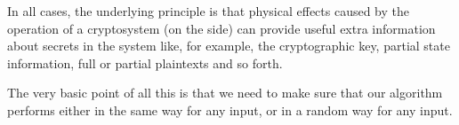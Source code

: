 In all cases, the underlying principle is that physical effects caused by the operation of a cryptosystem (on the side) can provide useful extra information about secrets in the system like, for example, the cryptographic key, partial state information, full or partial plaintexts and so forth.

The very basic point of all this is that we need to make sure that our algorithm performs either in the same way for any input, or in a random way for any input.
